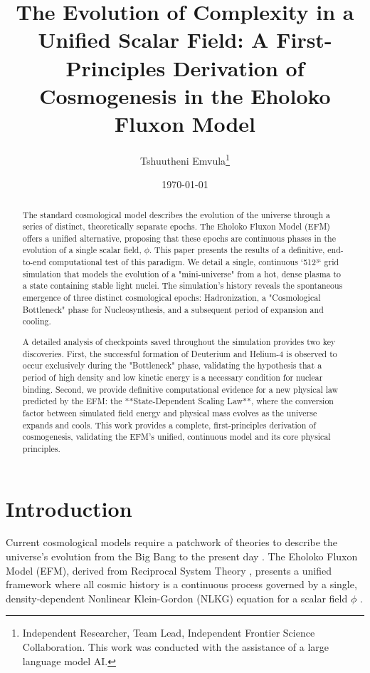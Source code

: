 \documentclass[11pt]{article}
\title{The Evolution of Complexity in a Unified Scalar Field: A First-Principles Derivation of Cosmogenesis in the Eholoko Fluxon Model}
\author{Tshuutheni Emvula\thanks{Independent Researcher, Team Lead, Independent Frontier Science Collaboration. This work was conducted with the assistance of a large language model AI.}}
\date{\today}
\begin{document}
\maketitle

\begin{abstract}
The standard cosmological model describes the evolution of the universe through a series of distinct, theoretically separate epochs. The Eholoko Fluxon Model (EFM) offers a unified alternative, proposing that these epochs are continuous phases in the evolution of a single scalar field, \(\phi\). This paper presents the results of a definitive, end-to-end computational test of this paradigm. We detail a single, continuous `512³` grid simulation that models the evolution of a "mini-universe" from a hot, dense plasma to a state containing stable light nuclei. The simulation's history reveals the spontaneous emergence of three distinct cosmological epochs: Hadronization, a "Cosmological Bottleneck" phase for Nucleosynthesis, and a subsequent period of expansion and cooling.

A detailed analysis of checkpoints saved throughout the simulation provides two key discoveries. First, the successful formation of Deuterium and Helium-4 is observed to occur exclusively during the "Bottleneck" phase, validating the hypothesis that a period of high density and low kinetic energy is a necessary condition for nuclear binding. Second, we provide definitive computational evidence for a new physical law predicted by the EFM: the **State-Dependent Scaling Law**, where the conversion factor between simulated field energy and physical mass evolves as the universe expands and cools. This work provides a complete, first-principles derivation of cosmogenesis, validating the EFM's unified, continuous model and its core physical principles.
\end{abstract}

\section{Introduction}
Current cosmological models require a patchwork of theories to describe the universe's evolution from the Big Bang to the present day \citep{pdg2022}. The Eholoko Fluxon Model (EFM), derived from Reciprocal System Theory \citep{larson1959}, presents a unified framework where all cosmic history is a continuous process governed by a single, density-dependent Nonlinear Klein-Gordon (NLKG) equation for a scalar field \(\phi\) \citep{emvula2025compendium_intro}.
\end{document}
